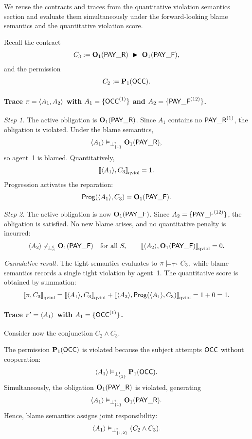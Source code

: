 \begin{example}
  We reuse the contracts and traces from the quantitative violation semantics section
  and evaluate them simultaneously under the forward-looking blame semantics and
  the quantitative violation score.
  
  Recall the contract
  \[
  C_3 := \obl[1]{\PAY}\ \repair\ \obl[1]{\PAYF},
  \]
  and the permission
  \[
  C_2 := \perm[1]{\OCC}.
  \]
  
  \paragraph{Trace $\pi = \trace{A_1,A_2}$ with
  $A_1=\{\OCC^{(1)}\}$ and $A_2=\{\PAYF^{(12)}\}$.}
  
  \emph{Step 1.}
  The active obligation is $\obl[1]{\PAY}$.
  Since $A_1$ contains no $\PAY^{(1)}$, the obligation is violated.
  Under the blame semantics,
  \[
  \trace{A_1} \vDash_{\bottp{\{1\}}} \obl[1]{\PAY},
  \]
  so agent~1 is blamed.
  Quantitatively,
  \[
  \qsem{\trace{A_1}, C_3} = 1.
  \]
  Progression activates the reparation:
  \[
  \Prog(\trace{A_1}, C_3) = \obl[1]{\PAYF}.
  \]
  
  \emph{Step 2.}
  The active obligation is now $\obl[1]{\PAYF}$.
  Since $A_2=\{\PAYF^{(12)}\}$, the obligation is satisfied.
  No new blame arises, and no quantitative penalty is incurred:
  \[
  \trace{A_2} \not\vDash_{\bottp{S}} \obl[1]{\PAYF}
  \quad\text{for all }S,
  \qquad
  \qsem{\trace{A_2}, \obl[1]{\PAYF}} = 0.
  \]
  
  \emph{Cumulative result.}
  The tight semantics evaluates to $\pi \satt C_3$,
  while blame semantics records a single tight violation by agent~1.
  The quantitative score is obtained by summation:
  \[
  \qsem{\pi, C_3}
  = \qsem{\trace{A_1}, C_3} + \qsem{\trace{A_2}, \Prog(\trace{A_1},C_3)}
  = 1 + 0 = 1.
  \]
  
  \paragraph{Trace $\pi'=\trace{A_1}$ with $A_1=\{\OCC^{(1)}\}$.}
  
  Consider now the conjunction $C_2 \wedge C_3$.
  
  The permission $\perm[1]{\OCC}$ is violated because the subject attempts
  $\OCC$ without cooperation:
  \[
  \trace{A_1} \vDash_{\bottp{\{2\}}} \perm[1]{\OCC}.
  \]
  Simultaneously, the obligation $\obl[1]{\PAY}$ is violated, generating
  \[
  \trace{A_1} \vDash_{\bottp{\{1\}}} \obl[1]{\PAY}.
  \]
  Hence, blame semantics assigns joint responsibility:
  \[
  \trace{A_1} \vDash_{\bottp{\{1,2\}}} (C_2 \wedge C_3).
  \]
  

\end{example}
